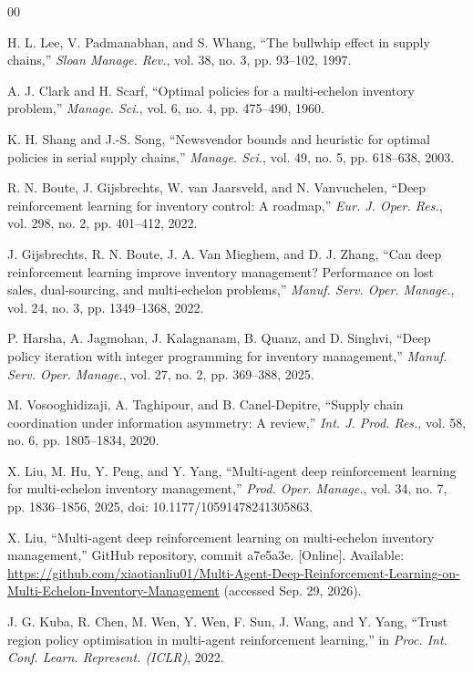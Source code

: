 \documentclass[conference]{IEEEtran}
\begin{document}
\begin{thebibliography}{00}

 H. L. Lee, V. Padmanabhan, and S. Whang, ``The bullwhip effect in supply chains,'' \emph{Sloan Manage. Rev.}, vol. 38, no. 3, pp. 93--102, 1997.

 A. J. Clark and H. Scarf, ``Optimal policies for a multi-echelon inventory problem,'' \emph{Manage. Sci.}, vol. 6, no. 4, pp. 475--490, 1960.

 K. H. Shang and J.-S. Song, ``Newsvendor bounds and heuristic for optimal policies in serial supply chains,'' \emph{Manage. Sci.}, vol. 49, no. 5, pp. 618--638, 2003.

 R. N. Boute, J. Gijsbrechts, W. van Jaarsveld, and N. Vanvuchelen, ``Deep reinforcement learning for inventory control: A roadmap,'' \emph{Eur. J. Oper. Res.}, vol. 298, no. 2, pp. 401--412, 2022.

 J. Gijsbrechts, R. N. Boute, J. A. Van Mieghem, and D. J. Zhang, ``Can deep reinforcement learning improve inventory management? Performance on lost sales, dual-sourcing, and multi-echelon problems,'' \emph{Manuf. Serv. Oper. Manage.}, vol. 24, no. 3, pp. 1349--1368, 2022.

 P. Harsha, A. Jagmohan, J. Kalagnanam, B. Quanz, and D. Singhvi, ``Deep policy iteration with integer programming for inventory management,'' \emph{Manuf. Serv. Oper. Manage.}, vol. 27, no. 2, pp. 369--388, 2025.

 M. Vosooghidizaji, A. Taghipour, and B. Canel-Depitre, ``Supply chain coordination under information asymmetry: A review,'' \emph{Int. J. Prod. Res.}, vol. 58, no. 6, pp. 1805--1834, 2020.

 X. Liu, M. Hu, Y. Peng, and Y. Yang, ``Multi-agent deep reinforcement learning for multi-echelon inventory management,'' \emph{Prod. Oper. Manage.}, vol. 34, no. 7, pp. 1836--1856, 2025, doi: 10.1177/10591478241305863.

 X. Liu, ``Multi-agent deep reinforcement learning on multi-echelon inventory management,'' GitHub repository, commit a7e5a3e. [Online]. Available: \url{https://github.com/xiaotianliu01/Multi-Agent-Deep-Reinforcement-Learning-on-Multi-Echelon-Inventory-Management} (accessed Sep. 29, 2026).

 J. G. Kuba, R. Chen, M. Wen, Y. Wen, F. Sun, J. Wang, and Y. Yang, ``Trust region policy optimisation in multi-agent reinforcement learning,'' in \emph{Proc. Int. Conf. Learn. Represent. (ICLR)}, 2022.


\end{thebibliography}
\end{document}
